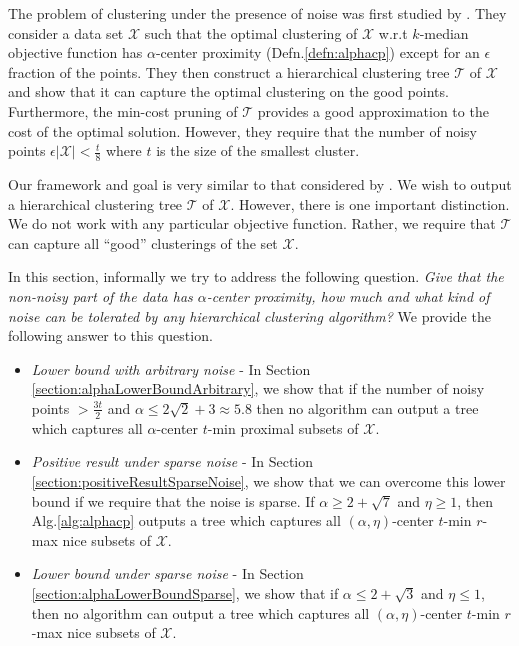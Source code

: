 \documentclass[anon,12pt]{colt2016} %
\newcommand{\mc}{\mathcal}
\begin{document}
The problem of clustering under the presence of noise was first studied by \cite{balcan2012clustering}. They consider a data set $\mc X$ such that the optimal clustering of $\mc X$ w.r.t $k$-median objective function has $\alpha$-center proximity (Defn.\ref{defn:alphacp}) except for an $\epsilon$ fraction of the points. They then construct a hierarchical clustering tree $\mc T$ of $\mc X$ and show that it can capture the optimal clustering on the good points. Furthermore, the min-cost pruning of $\mc T$ provides a good approximation to the cost of the optimal solution. However, they require that the number of noisy points $ \epsilon|\mc X|< \frac{t}{8}$ where $t$ is the size of the smallest cluster.

Our framework and goal is very similar to that considered by \cite{balcan2012clustering}. We wish to output a hierarchical clustering tree $\mc T$ of $\mc X$. However, there is one important distinction. We do not work with any particular objective function. Rather, we require that $\mc T$ can capture all ``good'' clusterings of the set $\mc X$.

In this section, informally we try to address the following question. {\it Give that the non-noisy part of the data has $\alpha$-center proximity, how much and what kind of noise can be tolerated by any hierarchical clustering algorithm?} We provide the following answer to this question.

\begin{itemize}
\item {\it Lower bound with arbitrary noise} - In Section \ref{section:alphaLowerBoundArbitrary}, we show that if the number of noisy points $> \frac{3t}{2}$ and $\alpha \le 2\sqrt{2} + 3 \approx 5.8$ then no algorithm can output a tree which captures all $\alpha$-center $t$-min proximal subsets of $\mc X$.
\item  {\it Positive result under sparse noise} - In Section \ref{section:positiveResultSparseNoise}, we show that we can overcome this lower bound if we require that the noise is sparse. If $\alpha \ge 2 + \sqrt{7}$ and $\eta \ge 1$, then Alg.\ref{alg:alphacp} outputs a tree which captures all $(\alpha, \eta)$-center $t$-min $r$-max nice subsets of $\mc X$.
\item  {\it Lower bound under sparse noise} - In Section \ref{section:alphaLowerBoundSparse}, we show that if $\alpha \le 2 + \sqrt{3}$ and $\eta \le 1$, then no algorithm can output a tree which captures all $(\alpha, \eta)$-center $t$-min $r$-max nice subsets of $\mc X$.
\end{itemize} 
\end{document}
